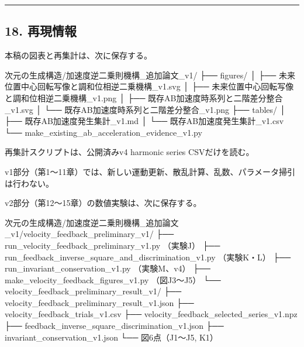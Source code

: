 \documentclass[
  a4paper,
]{ltjsarticle}
\newenvironment{Shaded}{}{}
\newcommand{\NormalTok}[1]{#1}
\begin{document}
\begin{center}\rule{0.5\linewidth}{0.5pt}\end{center}

\subsection{18. 再現情報}\label{ux518dux73feux60c5ux5831}

本稿の図表と再集計は、次に保存する。

\begin{Shaded}
\begin{Highlighting}[]
\NormalTok{次元の生成構造/加速度逆二乗則機構\_追加論文\_v1/}
\NormalTok{├── figures/}
\NormalTok{│   ├── 未来位置中心回転写像と調和位相逆二乗機構\_v1.svg}
\NormalTok{│   ├── 未来位置中心回転写像と調和位相逆二乗機構\_v1.png}
\NormalTok{│   ├── 既存AB加速度時系列と二階差分整合\_v1.svg}
\NormalTok{│   └── 既存AB加速度時系列と二階差分整合\_v1.png}
\NormalTok{├── tables/}
\NormalTok{│   ├── 既存AB加速度発生集計\_v1.md}
\NormalTok{│   └── 既存AB加速度発生集計\_v1.csv}
\NormalTok{└── make\_existing\_ab\_acceleration\_evidence\_v1.py}
\end{Highlighting}
\end{Shaded}

再集計スクリプトは、公開済みv4 harmonic series CSVだけを読む。

v1部分（第1〜11章）では、新しい運動更新、散乱計算、乱数、パラメータ掃引は行わない。

v2部分（第12〜15章）の数値実験は、次に保存する。

\begin{Shaded}
\begin{Highlighting}[]
\NormalTok{次元の生成構造/加速度逆二乗則機構\_追加論文\_v1/velocity\_feedback\_preliminary\_v1/}
\NormalTok{├── run\_velocity\_feedback\_preliminary\_v1.py          （実験J）}
\NormalTok{├── run\_feedback\_inverse\_square\_and\_discrimination\_v1.py （実験K・L）}
\NormalTok{├── run\_invariant\_conservation\_v1.py                 （実験M、v4）}
\NormalTok{├── make\_velocity\_feedback\_figures\_v1.py             （図J3〜J5）}
\NormalTok{└── velocity\_feedback\_preliminary\_result\_v1/}
\NormalTok{    ├── velocity\_feedback\_preliminary\_result\_v1.json}
\NormalTok{    ├── velocity\_feedback\_trials\_v1.csv}
\NormalTok{    ├── velocity\_feedback\_selected\_series\_v1.npz}
\NormalTok{    ├── feedback\_inverse\_square\_discrimination\_v1.json}
\NormalTok{    ├── invariant\_conservation\_v1.json}
\NormalTok{    └── 図6点（J1〜J5, K1）}
\end{Highlighting}
\end{Shaded}
\end{document}
